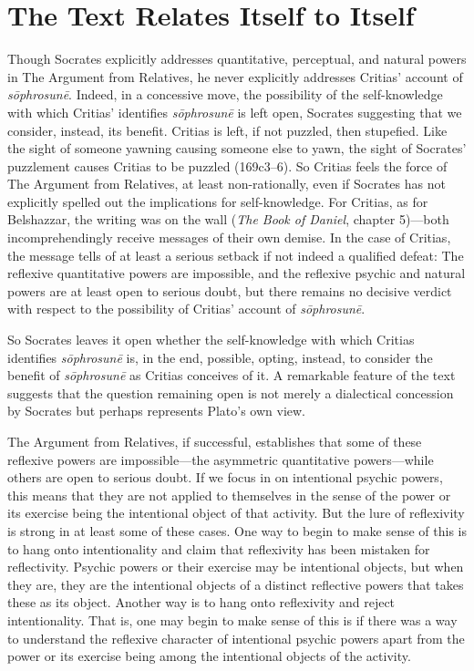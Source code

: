 

\section{The Text Relates Itself to Itself} %
\label{sec:the_text_relates_itself_to_itself}

Though Socrates explicitly addresses quantitative, perceptual, and natural powers in The Argument from Relatives, he never explicitly addresses Critias' account of \emph{sōphrosunē}. Indeed, in a concessive move, the possibility of the self-knowledge with which Critias' identifies \emph{sōphrosunē} is left open, Socrates suggesting that we consider, instead, its benefit. Critias is left, if not puzzled, then stupefied. Like the sight of someone yawning causing someone else to yawn, the sight of Socrates' puzzlement causes Critias to be puzzled (169c3–6). So Critias feels the force of The Argument from Relatives, at least non-rationally, even if Socrates has not explicitly spelled out the implications for self-knowledge. For Critias, as for Belshazzar, the writing was on the wall (\emph{The Book of Daniel}, chapter 5)—both incomprehendingly receive messages of their own demise. In the case of Critias, the message tells of at least a serious setback if not indeed a qualified defeat: The reflexive quantitative powers are impossible, and the reflexive psychic and natural powers are at least open to serious doubt, but there remains no decisive verdict with respect to the possibility of Critias' account of \emph{sōphrosunē}.

So Socrates leaves it open whether the self-knowledge with which Critias identifies \emph{sōphrosunē} is, in the end, possible, opting, instead, to consider the benefit of \emph{sōphrosunē} as Critias conceives of it. A remarkable feature of the text suggests that the question remaining open is not merely a dialectical concession by Socrates but perhaps represents Plato's own view. 

The Argument from Relatives, if successful, establishes that some of these reflexive powers are impossible—the asymmetric quantitative powers—while others are open to serious doubt. If we focus in on intentional psychic powers, this means that they are not applied to themselves in the sense of the power or its exercise being the intentional object of that activity. But the lure of reflexivity is strong in at least some of these cases. One way to begin to make sense of this is to hang onto intentionality and claim that reflexivity has been mistaken for reflectivity. Psychic powers or their exercise may be intentional objects, but when they are, they are the intentional objects of a distinct reflective powers that takes these as its object. Another way is to hang onto reflexivity and reject intentionality. That is, one may begin to make sense of this is if there was a way to understand the reflexive character of intentional psychic powers apart from the power or its exercise being among the intentional objects of the activity.

